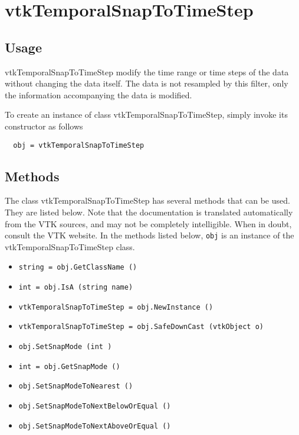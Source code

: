 \section{vtkTemporalSnapToTimeStep}

\subsection{Usage}

 vtkTemporalSnapToTimeStep  modify the time range or time steps of
 the data without changing the data itself. The data is not resampled
 by this filter, only the information accompanying the data is modified.

To create an instance of class vtkTemporalSnapToTimeStep, simply
invoke its constructor as follows
\begin{verbatim}
  obj = vtkTemporalSnapToTimeStep
\end{verbatim}
\subsection{Methods}

The class vtkTemporalSnapToTimeStep has several methods that can be used.
  They are listed below.
Note that the documentation is translated automatically from the VTK sources,
and may not be completely intelligible.  When in doubt, consult the VTK website.
In the methods listed below, \verb|obj| is an instance of the vtkTemporalSnapToTimeStep class.
\begin{itemize}
\item  \verb|string = obj.GetClassName ()|

\item  \verb|int = obj.IsA (string name)|

\item  \verb|vtkTemporalSnapToTimeStep = obj.NewInstance ()|

\item  \verb|vtkTemporalSnapToTimeStep = obj.SafeDownCast (vtkObject o)|

\item  \verb|obj.SetSnapMode (int )|

\item  \verb|int = obj.GetSnapMode ()|

\item  \verb|obj.SetSnapModeToNearest ()|

\item  \verb|obj.SetSnapModeToNextBelowOrEqual ()|

\item  \verb|obj.SetSnapModeToNextAboveOrEqual ()|

\end{itemize}
